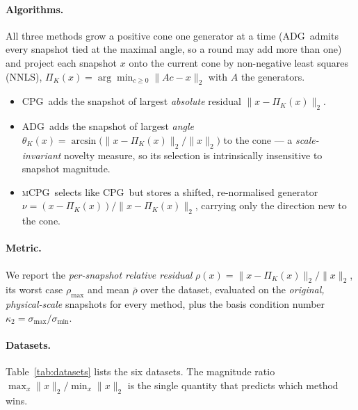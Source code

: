 \documentclass[11pt]{article}
\newcommand{\CPG}{\textsc{CPG}}
\newcommand{\ADG}{\textsc{ADG}}
\newcommand{\mCPG}{\textsc{mCPG}}
\begin{document}
\paragraph{Algorithms.}
All three methods grow a positive cone one generator at a time (\ADG\ admits
every snapshot tied at the maximal angle, so a round may add more than one)
and project each snapshot $x$ onto the current cone by non-negative
least squares (NNLS), $\Pi_K(x)=\arg\min_{c\ge0}\|Ac-x\|_2$ with $A$ the
generators.
\begin{itemize}
  \item \CPG\ adds the snapshot of largest \emph{absolute} residual
        $\|x-\Pi_K(x)\|_2$.
  \item \ADG\ adds the snapshot of largest \emph{angle}
        $\theta_K(x)=\arcsin\!\big(\|x-\Pi_K(x)\|_2/\|x\|_2\big)$ to the cone ---
        a \emph{scale-invariant} novelty measure, so its selection is intrinsically
        insensitive to snapshot magnitude.
  \item \mCPG\ selects like \CPG\ but stores a shifted, re-normalised generator
        $\nu=(x-\Pi_K(x))/\|x-\Pi_K(x)\|_2$, carrying only the direction new to the
        cone.
\end{itemize}

\paragraph{Metric.}
We report the \emph{per-snapshot relative residual}
$\rho(x)=\|x-\Pi_K(x)\|_2/\|x\|_2$, its worst case $\rho_{\max}$ and mean
$\bar\rho$ over the dataset, evaluated on the \emph{original, physical-scale}
snapshots for every method, plus the basis condition number
$\kappa_2=\sigma_{\max}/\sigma_{\min}$.

\paragraph{Datasets.}
Table~\ref{tab:datasets} lists the six datasets. The magnitude ratio
$\max_x\|x\|_2/\min_x\|x\|_2$ is the single quantity that predicts which method
wins.
\end{document}
